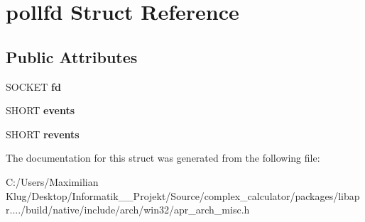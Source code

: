 \hypertarget{structpollfd}{}\section{pollfd Struct Reference}
\label{structpollfd}
\subsection*{Public Attributes}
\begin{DoxyCompactItemize}
\item 
\mbox{\label{structpollfd_a24e6b7a71f146721f56620a6f8e7606a}} 
S\+O\+C\+K\+ET {\bfseries fd}
\item 
\mbox{\label{structpollfd_a73d34a5c5ca1d74b9a999f9e93402798}} 
S\+H\+O\+RT {\bfseries events}
\item 
\mbox{\label{structpollfd_a1c25eff2bc2850786c17f83ec7bc97c4}} 
S\+H\+O\+RT {\bfseries revents}
\end{DoxyCompactItemize}


The documentation for this struct was generated from the following file\+:\begin{DoxyCompactItemize}
\item 
C\+:/\+Users/\+Maximilian Klug/\+Desktop/\+Informatik\+\_\+\_\+\+Projekt/\+Source/complex\+\_\+calculator/packages/libapr..../build/native/include/arch/win32/apr\+\_\+arch\+\_\+misc.\+h\end{DoxyCompactItemize}
